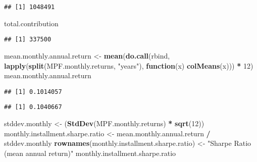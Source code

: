 \documentclass[]{article}
\newenvironment{Shaded}{\begin{snugshade}}{\end{snugshade}}
\newcommand{\ControlFlowTok}[1]{\textcolor[rgb]{0.13,0.29,0.53}{\textbf{#1}}}
\newcommand{\DecValTok}[1]{\textcolor[rgb]{0.00,0.00,0.81}{#1}}
\newcommand{\KeywordTok}[1]{\textcolor[rgb]{0.13,0.29,0.53}{\textbf{#1}}}
\newcommand{\NormalTok}[1]{#1}
\newcommand{\OperatorTok}[1]{\textcolor[rgb]{0.81,0.36,0.00}{\textbf{#1}}}
\newcommand{\StringTok}[1]{\textcolor[rgb]{0.31,0.60,0.02}{#1}}
\begin{document}
\begin{verbatim}
## [1] 1048491
\end{verbatim}

\begin{Shaded}
\begin{Highlighting}[]
\NormalTok{total.contribution}
\end{Highlighting}
\end{Shaded}

\begin{verbatim}
## [1] 337500
\end{verbatim}

\begin{Shaded}
\begin{Highlighting}[]
\NormalTok{mean.monthly.annual.return <-}
\StringTok{  }\KeywordTok{mean}\NormalTok{(}\KeywordTok{do.call}\NormalTok{(rbind, }\KeywordTok{lapply}\NormalTok{(}\KeywordTok{split}\NormalTok{(MPF.monthly.returns, }\StringTok{"years"}\NormalTok{), }\ControlFlowTok{function}\NormalTok{(x)}
    \KeywordTok{colMeans}\NormalTok{(x))) }\OperatorTok{*}\StringTok{ }\DecValTok{12}\NormalTok{)}
\NormalTok{mean.monthly.annual.return}
\end{Highlighting}
\end{Shaded}

\begin{verbatim}
## [1] 0.1014057
\end{verbatim}

\begin{Shaded}
\end{Shaded}

\begin{verbatim}
## [1] 0.1040667
\end{verbatim}

\begin{Shaded}
\begin{Highlighting}[]
\NormalTok{stddev.monthly <-}\StringTok{ }\NormalTok{(}\KeywordTok{StdDev}\NormalTok{(MPF.monthly.returns) }\OperatorTok{*}\StringTok{ }\KeywordTok{sqrt}\NormalTok{(}\DecValTok{12}\NormalTok{))}
\NormalTok{monthly.installment.sharpe.ratio <-}
\StringTok{  }\NormalTok{mean.monthly.annual.return }\OperatorTok{/}\StringTok{ }\NormalTok{stddev.monthly}
\KeywordTok{rownames}\NormalTok{(monthly.installment.sharpe.ratio) <-}
\StringTok{  "Sharpe Ratio (mean annual return)"}
\NormalTok{monthly.installment.sharpe.ratio}
\end{Highlighting}
\end{Shaded}
\end{document}
